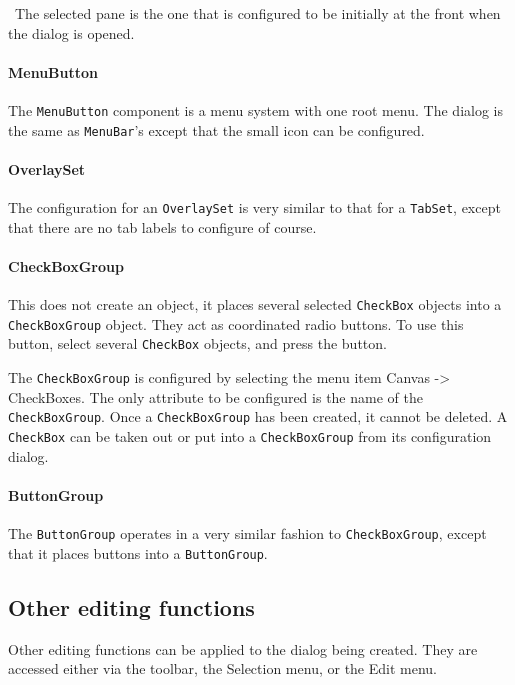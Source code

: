 \medskip{}\ {\sffamily The selected
pane is the one that is configured to be initially at the front when
the dialog is opened.}\medskip

\paragraph{MenuButton}
The \texttt{MenuButton} component is a menu system with one root
menu. The dialog is the same as \texttt{MenuBar}'s except that
the small icon can be configured.

\paragraph{OverlaySet}
The configuration for an \texttt{OverlaySet} is very similar to that for
a \texttt{TabSet}, except that there are no tab labels to configure of
course.

\paragraph{CheckBoxGroup}
This does not create an object, it
places several selected \texttt{CheckBox} objects into a
\texttt{CheckBoxGroup} object. They act as coordinated radio
buttons. To use this button, select several \texttt{CheckBox}
objects, and press the button.

The \texttt{CheckBoxGroup} is configured by selecting the menu
item Canvas -{\textgreater} CheckBoxes. The only attribute to
be configured is the name of the \texttt{CheckBoxGroup}. Once
a \texttt{CheckBoxGroup} has been created, it cannot be deleted. A
\texttt{CheckBox} can be taken out or put into a \texttt{CheckBoxGroup}
from its configuration dialog.

\paragraph{ButtonGroup}
The \texttt{ButtonGroup} operates in a very similar fashion to
\texttt{CheckBoxGroup}, except that it places buttons into a
\texttt{ButtonGroup}.



\subsection*{Other editing functions}

Other editing functions can be applied to
the dialog being created. They are accessed either via the toolbar,
the Selection menu, or the Edit menu.

